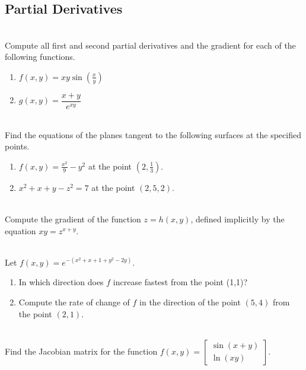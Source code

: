 \subsection{Partial Derivatives}

\BEN

\item
{}\\ 
Compute all first and second partial derivatives and the gradient
for each of the following functions.
\begin{enumerate}
 \item $f(x,y) = xy\sin(\frac{x}{y})$
 \item $g(x,y) = \dfrac{x+y}{e^{xy}}$
\end{enumerate}

\item
{}\\
Find the equations of the planes tangent to the following surfaces
at the specified points.
\begin{enumerate}
 \item $f(x,y) = \frac{x^2}{9} - y^2$ at the point $(2, \frac{1}{3})$.
 \item $x^2 + x + y - z^2 = 7$ at the point $(2, 5, 2)$.
\end{enumerate}

\item
{}\\ 
Compute the gradient of the function $z = h(x, y)$, defined implicitly by the
equation $xy = z^{x+y}$.

\item
{}\\ 

Let $f(x,y) = e^{-(x^2+x+1+y^2-2y)}$.
\begin{enumerate}
 \item In which direction does $f$ increase fastest from the point
  (1,1)?
 \item Compute the rate of change of $f$ in the direction of the
  point $(5,4)$ from the point $(2,1)$.
\end{enumerate}
\item {}\\ 
Find the Jacobian matrix for the function
$f(x,y) = \begin{bmatrix} \sin(x+y) \\ \ln(xy) \end{bmatrix}$.
\item {}

